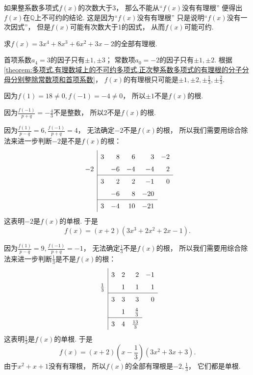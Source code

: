 \begin{remark}
如果整系数多项式\(f(x)\)的次数大于3，
那么不能从“\(f(x)\)没有有理根”
便得出\(f(x)\)在\(\mathbb{Q}\)上不可约的结论.
这是因为“\(f(x)\)没有有理根”
只是说明“\(f(x)\)没有一次因式”，
但是\(f(x)\)可能有次数大于1的因式，
从而\(f(x)\)可能可约.
\end{remark}

\begin{example}
求\(f(x)=3x^4+8x^3+6x^2+3x-2\)的全部有理根.
\begin{solution}
首项系数\(a_4=3\)的因子只有\(\pm1,\pm3\)；
常数项\(a_0=-2\)的因子只有\(\pm1,\pm2\).
根据\cref{theorem:多项式.有理数域上的不可约多项式.正次整系数多项式的有理根的分子分母分别整除常数项和首项系数}，
\(f(x)\)的有理根只可能是\(\pm1,\pm2,\pm\frac13,\pm\frac23\).

因为\(f(1)=18\neq0,
f(-1)=-4\neq0\)，
所以\(\pm1\)不是\(f(x)\)的根.

因为\(\frac{f(-1)}{p+q}=-\frac43\)不是整数，
所以\(2\)不是\(f(x)\)的根.

因为\(\frac{f(1)}{p-q}=6,
\frac{f(-1)}{p+q}=4\)，
无法确定\(-2\)不是\(f(x)\)的根，
所以我们需要用综合除法来进一步判断\(-2\)是不是\(f(x)\)的根：\[
	\begin{array}{r|*5r}
		& 3 & 8 & 6 & 3 & -2 \\
		-2 && -6 & -4 & -4 & 2 \\ \cline{2-6}
		& 3 & 2 & 2 & -1 & 0 \\
		&& -6 & 8 & -20 \\ \cline{2-5}
		& 3 & -4 & 10 & -21
	\end{array}
\]
这表明\(-2\)是\(f(x)\)的单根.
于是\[
	f(x)=(x+2)(3x^3+2x^2+2x-1).
\]

因为\(\frac{f(1)}{p-q}=9,
\frac{f(-1)}{p+q}=-1\)，
无法确定\(\frac13\)不是\(f(x)\)的根，
所以我们需要用综合除法来进一步判断\(\frac13\)是不是\(f(x)\)的根：\[
	\def\arraystretch{1.5}
	\begin{array}{r|*5r}
		& 3 & 2 & 2 & -1 \\
		\frac13 && 1 & 1 & 1 \\ \cline{2-5}
		& 3 & 3 & 3 & 0 \\
		&& 1 & \frac43 \\ \cline{2-4}
		& 3 & 4 & \frac{13}3
	\end{array}
\]
这表明\(\frac13\)是\(f(x)\)的单根.
于是\[
	f(x)=(x+2)\left(x-\frac13\right)
	(3x^2+3x+3).
\]
由于\(x^2+x+1\)没有有理根，
所以\(f(x)\)的全部有理根是\(-2,\frac13\)，
它们都是单根.
\end{solution}
\end{example}

